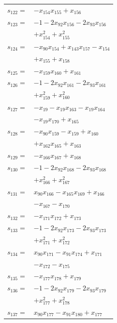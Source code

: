 \begin{longtable}{@{}r@{\;}l@{}}
\(s_{122}=\) & \(\displaystyle -x_{154}x_{155} +x_{156}\) \\[3pt]
\(s_{123}=\) & \(\displaystyle -1 -2x_{92}x_{156} -2x_{93}x_{156}\) \\
 & \(\displaystyle +x_{154}^{2} +x_{155}^{2}\) \\[3pt]
\(s_{124}=\) & \(\displaystyle -x_{90}x_{154} +x_{143}x_{157} -x_{154}\) \\
 & \(\displaystyle +x_{155} +x_{158}\) \\[3pt]
\(s_{125}=\) & \(\displaystyle -x_{159}x_{160} +x_{161}\) \\[3pt]
\(s_{126}=\) & \(\displaystyle -1 -2x_{92}x_{161} -2x_{93}x_{161}\) \\
 & \(\displaystyle +x_{159}^{2} +x_{160}^{2}\) \\[3pt]
\(s_{127}=\) & \(\displaystyle -x_{19} -x_{19}x_{163} -x_{19}x_{164}\) \\
 & \(\displaystyle -x_{19}x_{170} +x_{165}\) \\[3pt]
\(s_{128}=\) & \(\displaystyle -x_{90}x_{159} -x_{159} +x_{160}\) \\
 & \(\displaystyle +x_{162}x_{165} +x_{163}\) \\[3pt]
\(s_{129}=\) & \(\displaystyle -x_{166}x_{167} +x_{168}\) \\[3pt]
\(s_{130}=\) & \(\displaystyle -1 -2x_{92}x_{168} -2x_{93}x_{168}\) \\
 & \(\displaystyle +x_{166}^{2} +x_{167}^{2}\) \\[3pt]
\(s_{131}=\) & \(\displaystyle x_{90}x_{166} -x_{165}x_{169} +x_{166}\) \\
 & \(\displaystyle -x_{167} -x_{170}\) \\[3pt]
\(s_{132}=\) & \(\displaystyle -x_{171}x_{172} +x_{173}\) \\[3pt]
\(s_{133}=\) & \(\displaystyle -1 -2x_{92}x_{173} -2x_{93}x_{173}\) \\
 & \(\displaystyle +x_{171}^{2} +x_{172}^{2}\) \\[3pt]
\(s_{134}=\) & \(\displaystyle x_{90}x_{171} -x_{91}x_{174} +x_{171}\) \\
 & \(\displaystyle -x_{172} -x_{175}\) \\[3pt]
\(s_{135}=\) & \(\displaystyle -x_{177}x_{178} +x_{179}\) \\[3pt]
\(s_{136}=\) & \(\displaystyle -1 -2x_{92}x_{179} -2x_{93}x_{179}\) \\
 & \(\displaystyle +x_{177}^{2} +x_{178}^{2}\) \\[3pt]
\(s_{137}=\) & \(\displaystyle x_{90}x_{177} -x_{91}x_{180} +x_{177}\) \\

\end{longtable}
